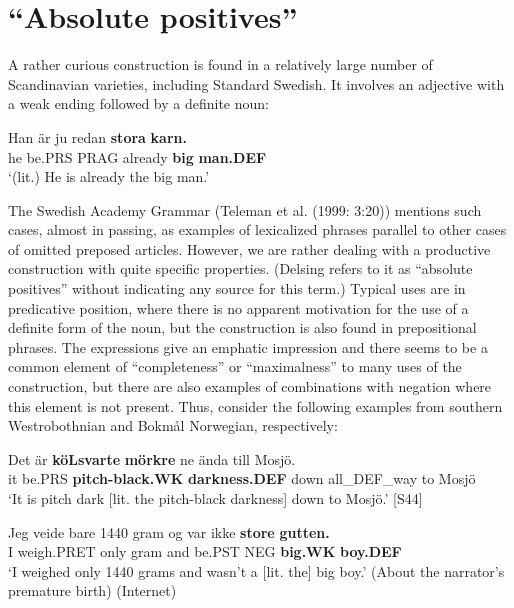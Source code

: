{\section{“Absolute positives”}
\label{bkm:Ref141250984}
A rather curious construction is found in a relatively large number of Scandinavian varieties, including Standard Swedish. It involves an adjective with a weak ending followed by a definite noun:


\ea\label{}
\gll Han  är  ju  redan  \textbf{stora}\textbf{  karn.}\\
he  be.PRS  PRAG  already  \textbf{big} \textbf{man.DEF}\\
\glt ‘(lit.) He is already the big man.’
\z

The Swedish Academy Grammar (Teleman et al. (1999: 3:20)) mentions such cases, almost in passing, as examples of lexicalized phrases parallel to other cases of omitted preposed articles. However, we are rather dealing with a productive construction with quite specific properties. (Delsing refers to it as “absolute positives” without indicating any source for this term.) Typical uses are in predicative position, where there is no apparent motivation for the use of a definite form of the noun, but the construction is also found in prepositional phrases. The expressions give an emphatic impression and there seems to be a common element of “completeness” or “maximalness” to many uses of the construction, but there are also examples of combinations with negation where this element is not present. Thus, consider the following examples from southern Westrobothnian and Bokmål Norwegian, respectively: 


\ea\label{}
\gll Det  är  \textbf{köLsvarte}\textbf{  mörkre} ne  ända  till  Mosjö.  \\
it  be.PRS  \textbf{pitch-black.WK} \textbf{darkness.DEF} down  all\_DEF\_way  to  Mosjö  \\
\glt ‘It is pitch dark [lit. the pitch-black darkness] down to Mosjö.’ [S44]
\z

\ea\label{}
\gll Jeg  veide  bare  1440  gram  og  var  ikke  \textbf{store} \textbf{gutten.}\\
I  weigh.PRET  only    gram  and  be.PST  NEG  \textbf{big.WK} \textbf{boy.DEF}\\
\glt ‘I weighed only 1440 grams and wasn’t a [lit. the] big boy.’ (About the narrator’s premature birth) (Internet) 
\z

}
